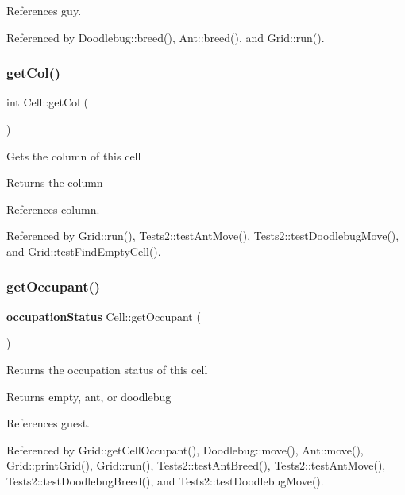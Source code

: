References guy.



Referenced by Doodlebug\+::breed(), Ant\+::breed(), and Grid\+::run().

\mbox{\label{classCell_ace419ef9ac6690bab2dd554d8b9f0d2f}} 
\subsubsection{get\+Col()}
{\footnotesize\ttfamily int Cell\+::get\+Col (\begin{DoxyParamCaption}{ }\end{DoxyParamCaption})}

Gets the column of this cell \begin{DoxyReturn}{Returns}
the column 
\end{DoxyReturn}


References column.



Referenced by Grid\+::run(), Tests2\+::test\+Ant\+Move(), Tests2\+::test\+Doodlebug\+Move(), and Grid\+::test\+Find\+Empty\+Cell().

\mbox{\label{classCell_a7dcb8bc75a2e2591b3fd52b5f7c28ab1}} 
\subsubsection{get\+Occupant()}
{\footnotesize\ttfamily \textbf{ occupation\+Status} Cell\+::get\+Occupant (\begin{DoxyParamCaption}{ }\end{DoxyParamCaption})}

Returns the occupation status of this cell \begin{DoxyReturn}{Returns}
empty, ant, or doodlebug 
\end{DoxyReturn}


References guest.



Referenced by Grid\+::get\+Cell\+Occupant(), Doodlebug\+::move(), Ant\+::move(), Grid\+::print\+Grid(), Grid\+::run(), Tests2\+::test\+Ant\+Breed(), Tests2\+::test\+Ant\+Move(), Tests2\+::test\+Doodlebug\+Breed(), and Tests2\+::test\+Doodlebug\+Move().

\mbox{\label{classCell_a6665d7f040a6a7b140e8d27c608a421e}} 
